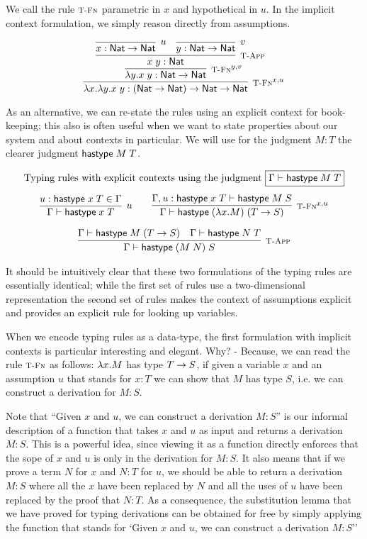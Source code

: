 We call the rule $\textsc{\footnotesize T-Fn}$ parametric in $x$ and hypothetical in $u$.
In the implicit context formulation, we simply reason directly from
assumptions.


\[
\infer[\TFn^{x,u}]{\lam x. \lam y. x \app y : (\Nat \arrow \Nat) \arrow \Nat \arrow \Nat}
{\infer[\TFn^{y,v}]{\lam y.x \app y : \Nat \arrow \Nat}{
 \infer[\TApp]{x \app y : \Nat}
   {\infer[u]{x:\Nat \arrow \Nat}{} &
    \infer[v]{y:\Nat \arrow \Nat}{}
   }
 }
}
\]

As an alternative, we can re-state the rules using an explicit context for
book-keeping; this also is often useful when we want to state properties about
our system and about contexts in particular. We will use for the judgment $M:T$
the clearer judgment $\textsf{hastype}\;M\;T$.



\[
\begin{array}{c}
\multicolumn{1}{l}{\mbox{Typing rules with explicit contexts using the judgment
    \fbox{$\Gamma \vdash \tmhastype M T$}}} \\[1em]
\infer[u]{\Gamma \vdash \tmhastype x T}{u:\tmhastype x T \in \Gamma} \qquad
\infer[\TFn^{x,u}]{\Gamma \vdash \tmhastype {(\lam x.M)} {(T \arrow S)}}
                 {\Gamma, u:\tmhastype x T \vdash \tmhastype M S}\\[1em]
\infer[\TApp]{\Gamma \vdash \tmhastype {(M \app N)} S}
             {\Gamma \vdash \tmhastype M (T \arrow S)
  & \Gamma \vdash \tmhastype N T}
\end{array}
\]

It should be intuitively clear that these two formulations of the typing rules
are essentially identical; while the first set of rules use a two-dimensional
representation the second set of rules makes the context of
assumptions explicit and provides an explicit rule for looking up variables.

When we encode typing rules as a data-type, the first formulation with implicit
contexts is particular interesting and elegant. Why? - Because, we can read the
rule $\textsc{\footnotesize T-Fn}$ as follows: $\lambda x.M$ has type $T \rightarrow S$, if given a variable
$x$ and an assumption $u$ that stands for $x:T$ we can show that $M$ has type
$S$, i.e. we can construct a derivation for $M:S$.

Note that ``Given $x$ and $u$, we can construct a derivation $M:S$'' is our
informal description of a function that takes $x$ and $u$ as input and returns a
derivation $M:S$. This is a powerful idea, since viewing it as a function
directly enforces that the sope of $x$ and $u$ is only in the derivation for
$M:S$. It also means that if we prove a term $N$ for $x$ and $N:T$ for $u$, we
should be able to return a derivation $M:S$ where all the $x$ have been replaced
by $N$ and all the uses of $u$ have been replaced by the proof that $N:T$. As a
consequence, the substitution lemma that we have proved for typing derivations
can be obtained for free by simply applying the function that stands for `Given
$x$ and $u$, we can construct a derivation $M:S$''



